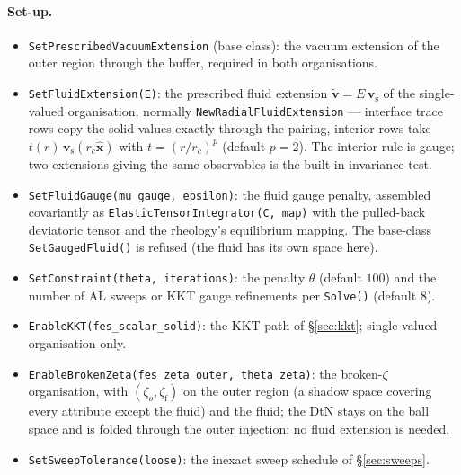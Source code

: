 \documentclass[11pt]{article}
\newcommand{\bv}{\mathbf{v}}
\newcommand{\bx}{\mathbf{x}}
\begin{document}
\paragraph{Set-up.}
\begin{itemize}
\item \texttt{SetPrescribedVacuumExtension} (base class): the vacuum
  extension of the outer region through the buffer, required in both
  organisations.
\item \texttt{SetFluidExtension(E)}: the prescribed fluid extension
  $\tilde{\bv} = E\,\bv_{\mathrm{s}}$ of the single-valued organisation,
  normally \texttt{NewRadialFluidExtension} --- interface trace rows copy
  the solid values exactly through the pairing, interior rows take
  $t(r)\,\bv_{\mathrm{s}}(r_c\hat{\bx})$ with $t = (r/r_c)^p$ (default
  $p = 2$). The interior rule is gauge; two extensions giving the same
  observables is the built-in invariance test.
\item \texttt{SetFluidGauge(mu\_gauge, epsilon)}: the fluid gauge
  penalty, assembled covariantly as
  \texttt{ElasticTensorIntegrator(C, map)} with the pulled-back
  deviatoric tensor and the rheology's equilibrium mapping. The
  base-class \texttt{SetGaugedFluid()} is refused (the fluid has its own
  space here).
\item \texttt{SetConstraint(theta, iterations)}: the penalty $\theta$
  (default $100$) and the number of AL sweeps or KKT gauge refinements
  per \texttt{Solve()} (default $8$).
\item \texttt{EnableKKT(fes\_scalar\_solid)}: the KKT path of
  \S\ref{sec:kkt}; single-valued organisation only.
\item \texttt{EnableBrokenZeta(fes\_zeta\_outer, theta\_zeta)}: the
  broken-$\zeta$ organisation, with $(\zeta_o, \zeta_{\mathrm{f}})$ on
  the outer region (a shadow space covering every attribute except the
  fluid) and the fluid; the DtN stays on the ball space and is folded
  through the outer injection; no fluid extension is needed.
\item \texttt{SetSweepTolerance(loose)}: the inexact sweep schedule of
  \S\ref{sec:sweeps}.
\end{itemize}
\end{document}
